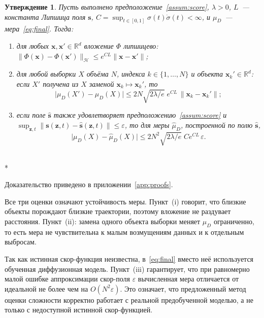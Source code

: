 \documentclass[14pt, a4paper]{extarticle}
\makeatletter
\theoremstyle{definition}
\theoremstyle{plain}
\newtheorem{proposition}[definition]{Утверждение}
\renewenvironment{proof}[1][\proofname]{\par
    \pushQED{\qed}%
    \normalfont \topsep6\p@\@plus6\p@\relax
    \trivlist
    \item[\hskip\labelsep\itshape #1\@addpunct{.}]\mbox{}\\*
    \ignorespaces
}{\popQED\endtrivlist\@endpefalse}
\makeatother
\begin{document}
\begin{proposition}
\label{prop:lipschitz}
Пусть выполнено предположение~\ref{assum:score}, $\lambda>0$, $L$~--- константа
Липшица поля $\mathbf{s}$, $C=\sup_{t\in[0,1]}\sigma(t)\dot\sigma(t)<\infty$, и
$\mu_D$~--- мера~\eqref{eq:final}. Тогда:
\begin{enumerate}
    \item[\textnormal{(i)}] для любых $\mathbf{x},\mathbf{x}'\in\mathbb{R}^d$
          вложение $\Phi$ липшицево:
          $\|\Phi(\mathbf{x})-\Phi(\mathbf{x}')\|_{\mathcal{H}}
          \le e^{CL}\|\mathbf{x}-\mathbf{x}'\|$;
    \item[\textnormal{(ii)}] для любой выборки $X$ объёма $N$, индекса
          $k\in\{1,\dots,N\}$ и объекта $\mathbf{x}_k'\in\mathbb{R}^d$:\, если
          $X'$ получена из $X$ заменой $\mathbf{x}_k\mapsto\mathbf{x}_k'$, то
          \[
              \big|\mu_D(X')-\mu_D(X)\big|
              \le 2N\sqrt{2\lambda/e}\;e^{CL}\,\|\mathbf{x}_k-\mathbf{x}_k'\|;
          \]
    \item[\textnormal{(iii)}] если поле $\widehat{\mathbf{s}}$ также
          удовлетворяет предположению~\ref{assum:score} и
          $\sup_{\mathbf{z},t}\|\mathbf{s}(\mathbf{z},t)
          -\widehat{\mathbf{s}}(\mathbf{z},t)\|\le\varepsilon$, то для меры
          $\widehat{\mu}_D$, построенной по полю $\widehat{\mathbf{s}}$,
          \[
              \big|\mu_D(X)-\widehat{\mu}_D(X)\big|
              \le 2N^2\sqrt{2\lambda/e}\;Ce^{CL}\,\varepsilon .
          \]
\end{enumerate}
\end{proposition}

\begin{proof}
Доказательство приведено в приложении~\ref{app:proofs}.
\end{proof}

Все три оценки означают устойчивость меры. Пункт~(i) говорит, что близкие объекты
порождают близкие траектории, поэтому вложение не раздувает расстояния. Пункт~(ii):
замена одного объекта выборки меняет $\mu_D$ ограниченно, то есть мера не
чувствительна к малым возмущениям данных и к отдельным выбросам. 

Так как истинная скор-функция неизвестна,
в~\eqref{eq:final} вместо неё используется обученная диффузионная модель.
Пункт~(iii) гарантирует, что при равномерно малой ошибке аппроксимации скор-поля
$\varepsilon$ вычисленная мера отличается от идеальной не более чем на
$O(N^2\varepsilon)$. Это означает, что предложенный метод оценки сложности корректно
работает с реальной предобученной моделью, а не только с недоступной истинной
скор-функцией.
\end{document}

